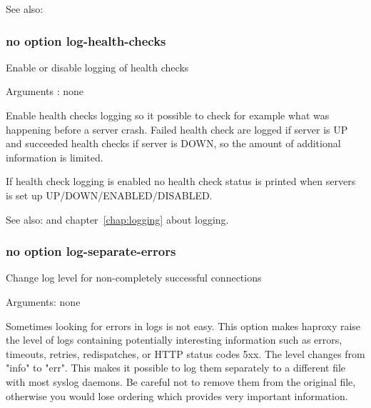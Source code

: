 See also: 

\subsubsection[log-health-checks]{}
\subsubsection*{no option log-health-checks}


  Enable or disable logging of health checks


  Arguments : none

  Enable health checks logging so it possible to check for example what
  was happening before a server crash. Failed health check are logged if
  server is UP and succeeded health checks if server is DOWN, so the amount
  of additional information is limited.

  If health check logging is enabled no health check status is printed
  when servers is set up UP/DOWN/ENABLED/DISABLED.


See also:  and chapter~\ref{chap:logging} about logging.

\subsubsection[log-separate-errors]{}
\subsubsection*{no option log-separate-errors}

  Change log level for non-completely successful connections


  Arguments: none

  Sometimes looking for errors in logs is not easy. This option makes haproxy
  raise the level of logs containing potentially interesting information such
  as errors, timeouts, retries, redispatches, or HTTP status codes 5xx. The
  level changes from "info" to "err". This makes it possible to log them
  separately to a different file with most syslog daemons. Be careful not to
  remove them from the original file, otherwise you would lose ordering which
  provides very important information.

